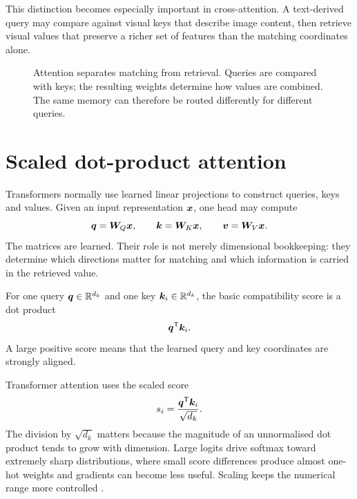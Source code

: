 This distinction becomes especially important in cross-attention. A text-derived query may compare against visual keys that describe image content, then retrieve visual values that preserve a richer set of features than the matching coordinates alone.

\begin{figure}[ht]
  \caption{Attention separates matching from retrieval. Queries are compared with keys; the resulting weights determine how values are combined. The same memory can therefore be routed differently for different queries.}
  \label{fig:week9-qkv-memory}
\end{figure}

\section{Scaled dot-product attention}

Transformers normally use learned linear projections to construct queries, keys and values. Given an input representation \(\bm{x}\), one head may compute
\[
  \bm{q}=\bm{W}_Q\bm{x},\qquad
  \bm{k}=\bm{W}_K\bm{x},\qquad
  \bm{v}=\bm{W}_V\bm{x}.
\]
The matrices are learned. Their role is not merely dimensional bookkeeping: they determine which directions matter for matching and which information is carried in the retrieved value.

For one query \(\bm{q}\in\mathbb{R}^{d_k}\) and one key \(\bm{k}_i\in\mathbb{R}^{d_k}\), the basic compatibility score is a dot product
\[
  \bm{q}^{\mathsf T}\bm{k}_i.
\]
A large positive score means that the learned query and key coordinates are strongly aligned.

Transformer attention uses the scaled score
\begin{equation}
  s_i = \frac{\bm{q}^{\mathsf T}\bm{k}_i}{\sqrt{d_k}}.
  \label{eq:week9-scaled-score}
\end{equation}
The division by \(\sqrt{d_k}\) matters because the magnitude of an unnormalised dot product tends to grow with dimension. Large logits drive softmax toward extremely sharp distributions, where small score differences produce almost one-hot weights and gradients can become less useful. Scaling keeps the numerical range more controlled \parencite{vaswani2017}.

